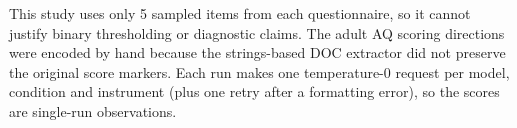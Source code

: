 This study uses only 5 sampled items from each questionnaire, so it cannot justify binary thresholding or diagnostic claims. The adult AQ scoring directions were encoded by hand because the strings-based DOC extractor did not preserve the original score markers. Each run makes one temperature-0 request per model, condition and instrument (plus one retry after a formatting error), so the scores are single-run observations.
